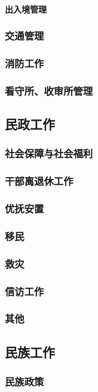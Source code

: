 \documentclass[UTF8]{../RepresentationUniverse}
\begin{document}
        \paragraph{出入境管理}

    \subsubsection{交通管理}
    \subsubsection{消防工作}
    \subsubsection{看守所、收审所管理}

\subsection{民政工作}
    \subsubsection{社会保障与社会福利}
    \subsubsection{干部离退休工作}
    \subsubsection{优抚安置}
    \subsubsection{移民}
    \subsubsection{救灾}
    \subsubsection{信访工作}
    \subsubsection{其他}

\subsection{民族工作}
    \subsubsection{民族政策}
\end{document}
